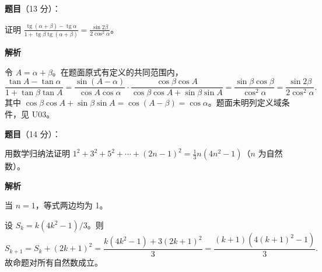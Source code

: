 \begin{answer}

\textbf{题目}（13 分）：

证明 $\displaystyle\frac{\operatorname{tg}(\alpha+\beta)-\operatorname{tg}\alpha}{1+\operatorname{tg}\beta\operatorname{tg}(\alpha+\beta)}=\frac{\sin2\beta}{2\cos^2\alpha}$。

\textbf{解析}

令 $A=\alpha+\beta$。在题面原式有定义的共同范围内，
\nopagebreak[4]
\[
\frac{\tan A-\tan\alpha}{1+\tan\beta\tan A}
=\frac{\sin(A-\alpha)}{\cos A\cos\alpha}\cdot
\frac{\cos\beta\cos A}{\cos\beta\cos A+\sin\beta\sin A}
=\frac{\sin\beta\cos\beta}{\cos^2\alpha}
=\frac{\sin2\beta}{2\cos^2\alpha}.
\]
其中 $\cos\beta\cos A+\sin\beta\sin A=\cos(A-\beta)=\cos\alpha$。题面未明列定义域条件，见 U03。


\end{answer}
\begin{answer}

\textbf{题目}（14 分）：

用数学归纳法证明 $1^2+3^2+5^2+\cdots +(2n-1)^2=\frac13n(4n^2-1)$（$n$ 为自然数）。

\textbf{解析}


当 $n=1$，等式两边均为 1。


设 $S_k=k(4k^2-1)/3$。则
\nopagebreak[4]
\[
S_{k+1}=S_k+(2k+1)^2
=\frac{k(4k^2-1)+3(2k+1)^2}{3}
=\frac{(k+1)(4(k+1)^2-1)}{3}.
\]
故命题对所有自然数成立。


\end{answer}
